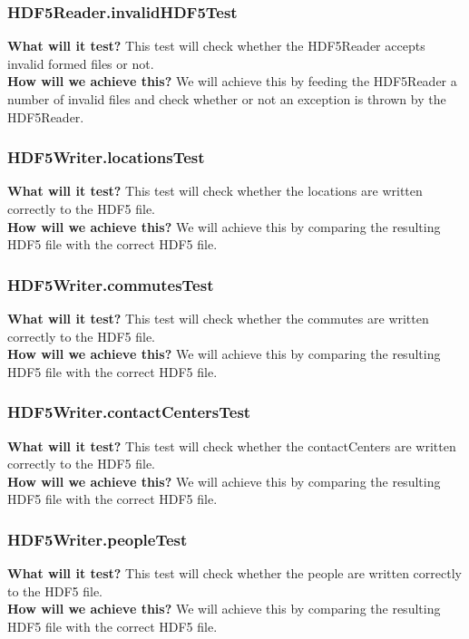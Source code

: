 \documentclass{article}
\begin{document}
\subsubsection{HDF5Reader.invalidHDF5Test}
\textbf{What will it test?}
This test will check whether the HDF5Reader accepts invalid formed files or not. \\
\newline
\textbf{How will we achieve this?}
We will achieve this by feeding the HDF5Reader a number of invalid files and check whether or not an exception is thrown by the HDF5Reader.

\subsubsection{HDF5Writer.locationsTest}
\textbf{What will it test?}
This test will check whether the locations are written correctly to the HDF5 file. \\
\newline
\textbf{How will we achieve this?}
We will achieve this by comparing the resulting HDF5 file with the correct HDF5 file.

\subsubsection{HDF5Writer.commutesTest}
\textbf{What will it test?}
This test will check whether the commutes are written correctly to the HDF5 file. \\
\newline 
\textbf{How will we achieve this?}
We will achieve this by comparing the resulting HDF5 file with the correct HDF5 file.

\subsubsection{HDF5Writer.contactCentersTest}
\textbf{What will it test?}
This test will check whether the contactCenters are written correctly to the HDF5 file. \\
\newline
\textbf{How will we achieve this?}
We will achieve this by comparing the resulting HDF5 file with the correct HDF5 file.

\subsubsection{HDF5Writer.peopleTest}
\textbf{What will it test?}
This test will check whether the people are written correctly to the HDF5 file. \\
\newline
\textbf{How will we achieve this?}
We will achieve this by comparing the resulting HDF5 file with the correct HDF5 file.
\end{document}
